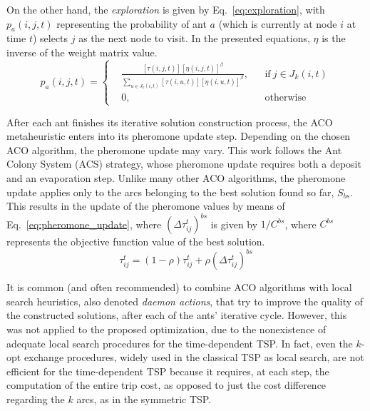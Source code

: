 On the other hand, the \textit{exploration} is given by Eq.~\ref{eq:exploration}, with $p_a(i,j,t)$ representing the probability of ant $a$ (which is currently at node $i$ at time $t$) selects $j$ as the next node to visit.
In the presented equations, $\eta$ is the inverse of the weight matrix value.
\begin{equation}
\label{eq:exploration}
  p_a(i,j,t) =  \left \{
    \begin{aligned}
      & \frac{[\tau(i,j,t)][\eta(i,j,t)]^\beta}{\sum_{u \in J_k(i,t)}[\tau(i,u,t)][\eta(i,u,t)]^\beta}, && \text{if}\ j \in J_k(i,t) \\
      &0, && \text{otherwise}
    \end{aligned} \right. 
\end{equation}


After each ant finishes its iterative solution construction process, the ACO metaheuristic enters into its pheromone update step. Depending on the chosen ACO algorithm, the pheromone update may vary. This work follows the Ant Colony System (ACS) strategy, whose pheromone update requires both a deposit and an evaporation step. Unlike many other ACO algorithms, the pheromone update applies only to the arcs belonging to the best solution found so far, $S_{bs}$. This results in the update of the pheromone values by means of Eq.~\ref{eq:pheromone_update}, where $(\Delta\tau_{ij}^{t})^{bs}$ is given by $1/C^{bs}$, where $C^{bs}$ represents the objective function value of the best solution.
\begin{equation}
\label{eq:pheromone_update}
    \tau_{ij}^{t} = (1-\rho)\tau_{ij}^{t} + \rho (\Delta \tau_{ij}^{t})^{bs}
\end{equation}

It is common (and often recommended) to combine ACO algorithms with local search heuristics, also denoted \textit{daemon actions}, that try to improve the quality of the constructed solutions, after each of the ants' iterative cycle. However, this was not applied to the proposed optimization, due to the nonexistence of adequate local search procedures for the time-dependent TSP. In fact, even the $k$-opt exchange procedures, widely used in the classical TSP as local search, are not efficient for the time-dependent TSP because it requires, at each step, the computation of the entire trip cost, as opposed to just the cost difference regarding the $k$ arcs, as in the symmetric TSP.





